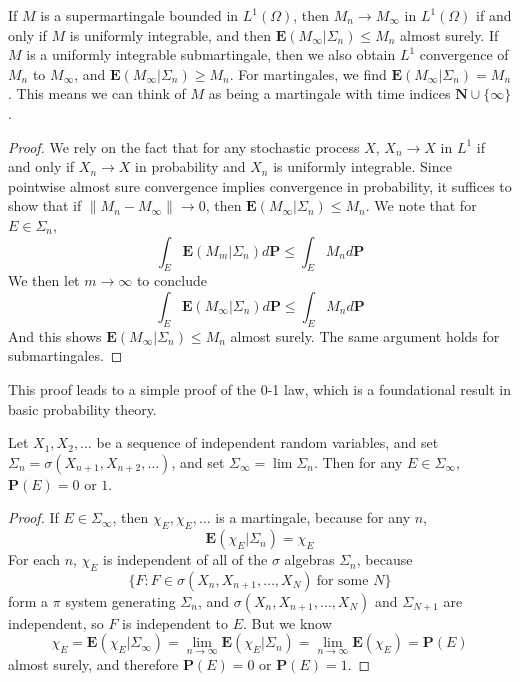 \begin{corollary}
    If $M$ is a supermartingale bounded in $L^1(\Omega)$, then $M_n \to M_\infty$ in $L^1(\Omega)$ if and only if $M$ is uniformly integrable, and then $\mathbf{E}(M_\infty | \Sigma_n) \leq M_n$ almost surely. If $M$ is a uniformly integrable submartingale, then we also obtain $L^1$ convergence of $M_n$ to $M_\infty$, and $\mathbf{E}(M_\infty | \Sigma_n) \geq M_n$. For martingales, we find $\mathbf{E}(M_\infty | \Sigma_n) = M_n$. This means we can think of $M$ as being a martingale with time indices $\mathbf{N} \cup \{ \infty \}$.
\end{corollary}
\begin{proof}
    We rely on the fact that for any stochastic process $X$, $X_n \to X$ in $L^1$ if and only if $X_n \to X$ in probability and $X_n$ is uniformly integrable. Since pointwise almost sure convergence implies convergence in probability, it suffices to show that if $\| M_n - M_\infty \| \to 0$, then $\mathbf{E}(M_\infty | \Sigma_n) \leq M_n$. We note that for $E \in \Sigma_n$,
    \[ \int_E \mathbf{E}(M_m|\Sigma_n) d\mathbf{P} \leq \int_E M_n d\mathbf{P}  \]
    We then let $m \to \infty$ to conclude
    \[ \int_E \mathbf{E}(M_\infty|\Sigma_n) d\mathbf{P} \leq \int_E M_n d\mathbf{P} \]
    And this shows $\mathbf{E}(M_\infty|\Sigma_n) \leq M_n$ almost surely. The same argument holds for submartingales.
\end{proof}

This proof leads to a simple proof of the 0-1 law, which is a foundational result in basic probability theory.

\begin{corollary}
    Let $X_1, X_2, \dots$ be a sequence of independent random variables, and set $\Sigma_n = \sigma(X_{n+1}, X_{n+2}, \dots)$, and set $\Sigma_\infty = \lim \Sigma_n$. Then for any $E \in \Sigma_\infty$, $\mathbf{P}(E) = 0$ or $1$.
\end{corollary}
\begin{proof}
    If $E \in \Sigma_\infty$, then $\chi_E, \chi_E, \dots$ is a martingale, because for any $n$,
    \[ \mathbf{E}(\chi_E | \Sigma_n) = \chi_E \]
    For each $n$, $\chi_E$ is independent of all of the $\sigma$ algebras $\Sigma_n$, because
    \[ \{ F: F \in \sigma(X_n, X_{n+1}, \dots, X_N)\ \text{for some $N$} \} \]
    form a $\pi$ system generating $\Sigma_n$, and $\sigma(X_n,X_{n+1}, \dots, X_N)$ and $\Sigma_{N+1}$ are independent, so $F$ is independent to $E$. But we know
    \[ \chi_E = \mathbf{E}(\chi_E|\Sigma_\infty) = \lim_{n \to \infty} \mathbf{E}(\chi_E|\Sigma_n) = \lim_{n \to \infty} \mathbf{E}(\chi_E) = \mathbf{P}(E) \]
    almost surely, and therefore $\mathbf{P}(E) = 0$ or $\mathbf{P}(E) = 1$.
\end{proof}

